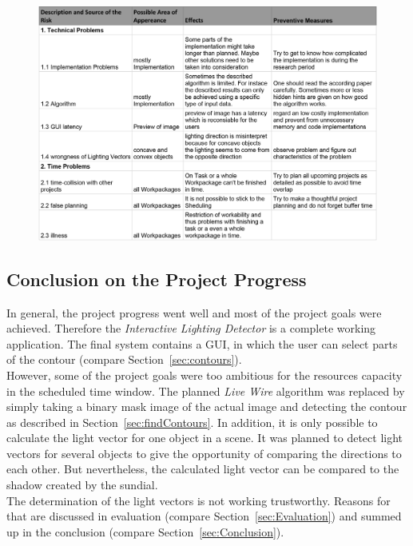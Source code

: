 \begin{figure}[H] 
	\center 
	\includegraphics[width = \linewidth]{Images/risks.jpg}			
\end{figure}

\subsection{Conclusion on the Project Progress} \label{sec:pmCon}

In general, the project progress went well and most of the project goals were achieved. Therefore the \textit{Interactive Lighting Detector} is a complete working application. The final system contains a GUI, in which the user can select parts of the contour (compare Section~\ref{sec:contours}). \\
However, some of the project goals were too ambitious for the resources capacity in the scheduled time window. The planned \textit{Live Wire} algorithm was replaced by simply taking a binary mask image of the actual image and detecting the contour as described in Section~\ref{sec:findContours}. In addition, it is only possible to calculate the light vector for one object in a scene. It was planned to detect light vectors for several objects to give the opportunity of comparing the directions to each other. But nevertheless, the calculated light vector can be compared to the shadow created by the sundial. \\
The determination of the light vectors is not working trustworthy. Reasons for that are discussed in evaluation (compare Section~\ref{sec:Evaluation}) and summed up in the conclusion (compare Section~\ref{sec:Conclusion}).



\newpage

























